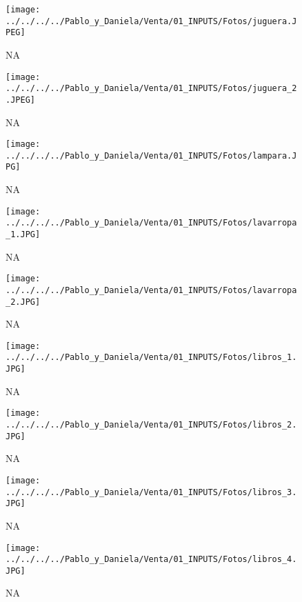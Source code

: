 \documentclass[
]{article}
\begin{document}
\pagebreak

\begin{figure}
\centering
\texttt{[image: ../../../../Pablo\_y\_Daniela/Venta/01\_INPUTS/Fotos/juguera.JPEG]}
\caption{NA}
\end{figure}

\pagebreak

\begin{figure}
\centering
\texttt{[image: ../../../../Pablo\_y\_Daniela/Venta/01\_INPUTS/Fotos/juguera\_2.JPEG]}
\caption{NA}
\end{figure}

\pagebreak

\begin{figure}
\centering
\texttt{[image: ../../../../Pablo\_y\_Daniela/Venta/01\_INPUTS/Fotos/lampara.JPG]}
\caption{NA}
\end{figure}

\pagebreak

\begin{figure}
\centering
\texttt{[image: ../../../../Pablo\_y\_Daniela/Venta/01\_INPUTS/Fotos/lavarropa\_1.JPG]}
\caption{NA}
\end{figure}

\pagebreak

\begin{figure}
\centering
\texttt{[image: ../../../../Pablo\_y\_Daniela/Venta/01\_INPUTS/Fotos/lavarropa\_2.JPG]}
\caption{NA}
\end{figure}

\pagebreak

\begin{figure}
\centering
\texttt{[image: ../../../../Pablo\_y\_Daniela/Venta/01\_INPUTS/Fotos/libros\_1.JPG]}
\caption{NA}
\end{figure}

\pagebreak

\begin{figure}
\centering
\texttt{[image: ../../../../Pablo\_y\_Daniela/Venta/01\_INPUTS/Fotos/libros\_2.JPG]}
\caption{NA}
\end{figure}

\pagebreak

\begin{figure}
\centering
\texttt{[image: ../../../../Pablo\_y\_Daniela/Venta/01\_INPUTS/Fotos/libros\_3.JPG]}
\caption{NA}
\end{figure}

\pagebreak

\begin{figure}
\centering
\texttt{[image: ../../../../Pablo\_y\_Daniela/Venta/01\_INPUTS/Fotos/libros\_4.JPG]}
\caption{NA}
\end{figure}
\end{document}
